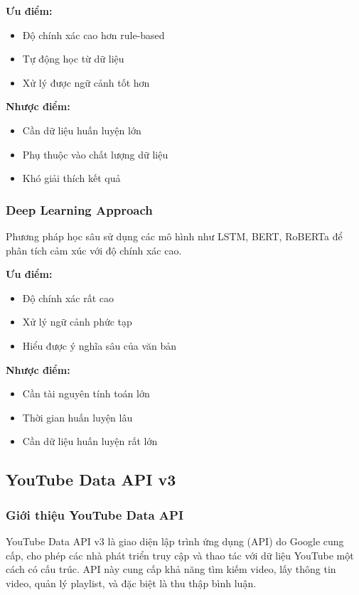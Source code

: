 \textbf{Ưu điểm:}
\begin{itemize}
    \item Độ chính xác cao hơn rule-based
    \item Tự động học từ dữ liệu
    \item Xử lý được ngữ cảnh tốt hơn
\end{itemize}

\textbf{Nhược điểm:}
\begin{itemize}
    \item Cần dữ liệu huấn luyện lớn
    \item Phụ thuộc vào chất lượng dữ liệu
    \item Khó giải thích kết quả
\end{itemize}

\subsubsection{Deep Learning Approach}
Phương pháp học sâu sử dụng các mô hình như LSTM, BERT, RoBERTa để phân tích cảm xúc với độ chính xác cao.

\textbf{Ưu điểm:}
\begin{itemize}
    \item Độ chính xác rất cao
    \item Xử lý ngữ cảnh phức tạp
    \item Hiểu được ý nghĩa sâu của văn bản
\end{itemize}

\textbf{Nhược điểm:}
\begin{itemize}
    \item Cần tài nguyên tính toán lớn
    \item Thời gian huấn luyện lâu
    \item Cần dữ liệu huấn luyện rất lớn
\end{itemize}

\subsection{YouTube Data API v3}

\subsubsection{Giới thiệu YouTube Data API}
YouTube Data API v3 là giao diện lập trình ứng dụng (API) do Google cung cấp, cho phép các nhà phát triển truy cập và thao tác với dữ liệu YouTube một cách có cấu trúc. API này cung cấp khả năng tìm kiếm video, lấy thông tin video, quản lý playlist, và đặc biệt là thu thập bình luận.

